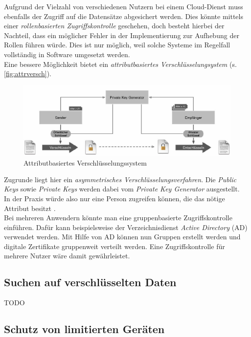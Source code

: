 \documentclass[conference]{IEEEtran}
\begin{document}
Aufgrund der Vielzahl von verschiedenen Nutzern bei einem Cloud-Dienst muss ebenfalls der Zugriff auf die Datensätze abgesichert werden. Dies könnte mittels einer \textit{rollenbasierten Zugriffskontrolle} geschehen, doch besteht hierbei der Nachteil, dass ein möglicher Fehler in der Implementierung zur Aufhebung der Rollen führen würde. Dies ist nur möglich, weil solche Systeme im Regelfall vollständig in Software umgesetzt werden.\\
Eine bessere Möglichkeit bietet ein \textit{attributbasiertes Verschlüsselungsystem} (s. \autoref{fig:attrversch}).  
\begin{figure}
\centering
\includegraphics[width=1.5\columnwidth]{attr}
\caption{Attributbasiertes Verschlüsselungssystem}
\label{fig:attrversch}
\end{figure}

Zugrunde liegt hier ein \textit{asymmetrisches Verschlüsselungsverfahren}. Die \textit{Public Keys} sowie \textit{Private Keys} werden dabei vom \textit{Private Key Generator} ausgestellt.\\
In der Praxis würde also nur eine Person zugreifen können, die das nötige Attribut besitzt \cite{eckert2015}.\\
Bei mehreren Anwendern könnte man eine gruppenbasierte Zugriffskontrolle einführen. Dafür kann beispielsweise der Verzeichnisdienst \textit{Active Directory} (AD) verwendet werden. Mit Hilfe von AD können nun Gruppen erstellt werden und digitale Zertifikate gruppenweit verteilt werden. Eine Zugriffskontrolle für mehrere Nutzer wäre damit gewährleistet.\\

\subsection{Suchen auf verschlüsselten Daten}
TODO

\subsection{Schutz von limitierten Geräten}
\end{document}
